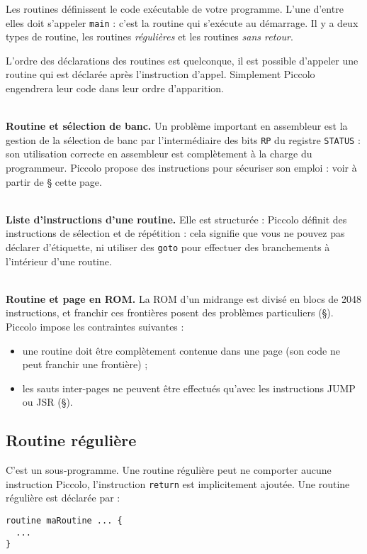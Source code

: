
Les routines définissent le code exécutable de votre programme. L’une d’entre elles doit s’appeler \texttt{main} : c’est la routine qui s’exécute au démarrage. Il y a deux types de routine, les routines \emph{régulières} et les routines \emph{sans retour}.


L’ordre des déclarations des routines est quelconque, il est possible d’appeler une routine qui est déclarée après l’instruction d’appel. Simplement Piccolo engendrera leur code dans leur ordre d’apparition. 

~\\
\textbf{Routine et sélection de banc.} Un problème important en assembleur est la gestion de la sélection de banc par l’intermédiaire des bits \texttt{RP} du registre \texttt{STATUS} : son utilisation correcte en assembleur est complètement à la charge du programmeur. Piccolo propose des instructions pour sécuriser son emploi : voir à partir de § cette page.

~\\
\textbf{Liste d’instructions d’une routine.} Elle est structurée : Piccolo définit des instructions de sélection et de répétition : cela signifie que vous ne pouvez pas déclarer d’étiquette, ni utiliser des \texttt{goto} pour effectuer des branchements à l’intérieur d’une routine.

~\\
\textbf{Routine et page en ROM.} La ROM d’un midrange est divisé en blocs de 2048 instructions, et franchir ces frontières posent des problèmes particuliers (§). Piccolo impose les contraintes suivantes :\begin{itemize}
  \item une routine doit être complètement contenue dans une page (son code ne peut franchir une frontière) ;
  \item les sauts inter-pages ne peuvent être effectués qu’avec les instructions JUMP ou JSR (§).
\end{itemize}

\subsection{Routine régulière}

C'est un sous-programme. Une routine régulière peut ne comporter aucune instruction Piccolo, l'instruction \texttt{return} est implicitement ajoutée. Une routine régulière est déclarée par :
\begin{lstlisting}[language=piccolo]
routine maRoutine ... {
  ...
}
\end{lstlisting}

